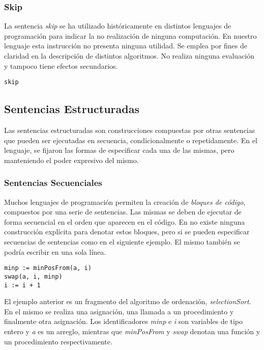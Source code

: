 \documentclass{article}
\begin{document}
\subsubsection{Skip}

La sentencia \textit{skip} se ha utilizado históricamente en distintos lenguajes de programación para indicar la no realización de ninguna computación.
En nuestro lenguaje esta instrucción no presenta ninguna utilidad.
Se emplea por fines de claridad en la descripción de distintos algoritmos.
No realiza ninguna evaluación y tampoco tiene efectos secundarios.
\begin{lstlisting}
skip
\end{lstlisting}

\subsection{Sentencias Estructuradas}

Las sentencias estructuradas son construcciones compuestas por otras sentencias que pueden ser ejecutadas en secuencia, condicionalmente o repetidamente.
En el lenguaje, se fijaron las formas de especificar cada una de las mismas, pero manteniendo el poder expresivo del mismo.

\subsubsection{Sentencias Secuenciales}

Muchos lenguajes de programación permiten la creación de \textit{bloques de código}, compuestos por una serie de sentencias.
Las mismas se deben de ejecutar de forma secuencial en el orden que aparecen en el código.
En \Lang\space no existe ninguna construcción explícita para denotar estos bloques, pero si se pueden especificar secuencias de sentencias como en el siguiente ejemplo.
El mismo también se podría escribir en una sola línea.
\begin{lstlisting}
minp := minPosFrom(a, i)
swap(a, i, minp)
i := i + 1
\end{lstlisting}

El ejemplo anterior es un fragmento del algoritmo de ordenación, \textit{selectionSort}.
En el mismo se realiza una asignación, una llamada a un procedimiento y finalmente otra asignación.
Los identificadores \textit{minp} e \textit{i} son variables de tipo entero y \textit{a} es un arreglo, mientras que \textit{minPosFrom} y \textit{swap} denotan una función y un procedimiento respectivamente.
\end{document}
